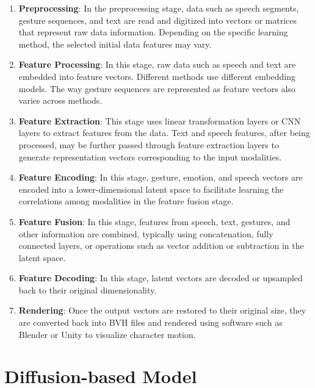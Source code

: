 \begin{enumerate}[label=\textbf{\arabic*.}]
	\item \textbf{Preprocessing}: In the preprocessing stage, data such as speech segments, gesture sequences, and text are read and digitized into vectors or matrices that represent raw data information. Depending on the specific learning method, the selected initial data features may vary.

	\item \textbf{Feature Processing}: In this stage, raw data such as speech and text are embedded into feature vectors. Different methods use different embedding models. The way gesture sequences are represented as feature vectors also varies across methods.

	\item \textbf{Feature Extraction}: This stage uses linear transformation layers or CNN layers to extract features from the data. Text and speech features, after being processed, may be further passed through feature extraction layers to generate representation vectors corresponding to the input modalities.

	\item \textbf{Feature Encoding}: In this stage, gesture, emotion, and speech vectors are encoded into a lower-dimensional latent space to facilitate learning the correlations among modalities in the feature fusion stage.

	\item \textbf{Feature Fusion}: In this stage, features from speech, text, gestures, and other information are combined, typically using concatenation, fully connected layers, or operations such as vector addition or subtraction in the latent space.

	\item \textbf{Feature Decoding}: In this stage, latent vectors are decoded or upsampled back to their original dimensionality.

	\item \textbf{Rendering}: Once the output vectors are restored to their original size, they are converted back into BVH files and rendered using software such as Blender or Unity to visualize character motion.
\end{enumerate}

\section{Diffusion-based Model}
\label{sec:diffusionbase}

